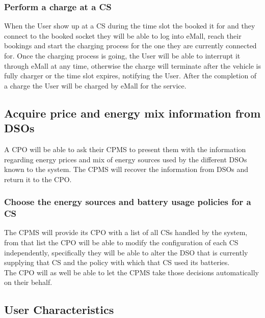 \documentclass[11pt]{article}
\begin{document}
\subsubsection{Perform a charge at a CS}

When the User show up at a CS during the time slot the booked it for and they connect to the booked socket they will be able to log into eMall, reach their bookings and start the charging process for the one they are currently connected for. Once the charging process is going, the User will be able to interrupt it through eMall at any time, otherwise the charge will terminate after the vehicle is fully charger or the time slot expires, notifying the User. After the completion of a charge the User will be charged by eMall for the service.

\subsection{Acquire price and energy mix information from DSOs}

A CPO will be able to ask their CPMS to present them with the information regarding energy prices and mix of energy sources used by the different DSOs known to the system. The CPMS will recover the information from DSOs and return it to the CPO.

\subsubsection{Choose the energy sources and battery usage policies for a CS}

The CPMS will provide its CPO with a list of all CSs handled by the system, from that list the CPO will be able to modify the configuration of each CS independently, specifically they will be able to alter the DSO that is currently supplying that CS and the policy with which that CS used its batteries. \\
The CPO will as well be able to let the CPMS take those decisions automatically on their behalf.

\subsection{User Characteristics}
\end{document}
